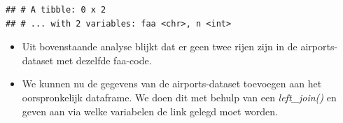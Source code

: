 \documentclass[]{tufte-book}
\newenvironment{Shaded}{}{}
\newcommand{\DataTypeTok}[1]{\textcolor[rgb]{0.56,0.13,0.00}{#1}}
\newcommand{\DecValTok}[1]{\textcolor[rgb]{0.25,0.63,0.44}{#1}}
\newcommand{\KeywordTok}[1]{\textcolor[rgb]{0.00,0.44,0.13}{\textbf{#1}}}
\newcommand{\NormalTok}[1]{#1}
\newcommand{\OperatorTok}[1]{\textcolor[rgb]{0.40,0.40,0.40}{#1}}
\newcommand{\StringTok}[1]{\textcolor[rgb]{0.25,0.44,0.63}{#1}}
\providecommand{\tightlist}{%
  \setlength{\itemsep}{0pt}\setlength{\parskip}{0pt}}
\begin{document}
\begin{Shaded}
\end{Shaded}

\begin{verbatim}
## # A tibble: 0 x 2
## # ... with 2 variables: faa <chr>, n <int>
\end{verbatim}

\begin{itemize}
\tightlist
\item
  Uit bovenstaande analyse blijkt dat er geen twee rijen zijn in de airports-dataset met dezelfde faa-code.
\item
  We kunnen nu de gegevens van de airports-dataset toevoegen aan het oorspronkelijk dataframe. We doen dit met behulp van een \emph{left\_join()} en geven aan via welke variabelen de link gelegd moet worden.
\end{itemize}

\begin{Shaded}
\end{Shaded}
\end{document}
